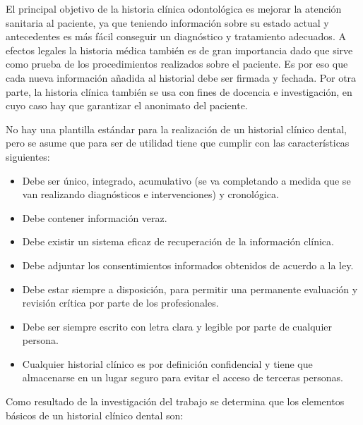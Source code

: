 El principal objetivo de la historia clínica odontológica es mejorar la atención sanitaria al paciente, ya que teniendo información sobre su estado actual y antecedentes es más fácil conseguir un diagnóstico y tratamiento adecuados. A efectos legales la historia médica también es de gran importancia dado que sirve como prueba de los procedimientos realizados sobre el paciente. Es por eso que cada nueva información añadida al historial debe ser firmada y fechada. Por otra parte, la historia clínica también se usa con fines de docencia e investigación, en cuyo caso hay que garantizar el anonimato del paciente.\cite{A06}

No hay una plantilla estándar para la realización de un historial clínico dental, pero se asume que para ser de utilidad tiene que cumplir con las características siguientes: 
\begin{itemize}
\item Debe ser único, integrado, acumulativo (se va completando a medida que se van realizando diagnósticos e intervenciones) y cronológica.
\item Debe contener información veraz.
\item Debe existir un sistema eficaz de recuperación de la información clínica.
\item Debe adjuntar los consentimientos informados obtenidos de acuerdo a la ley.
\item Debe estar siempre a disposición, para permitir una permanente evaluación y revisión crítica por parte de los profesionales.
\item Debe ser siempre escrito con letra clara y legible por parte de cualquier persona.
\item Cualquier historial clínico es por definición confidencial y tiene que almacenarse en un lugar seguro para evitar el acceso de terceras personas.
\end{itemize}

Como resultado de la investigación del trabajo se determina que los elementos básicos de un historial clínico dental son:


